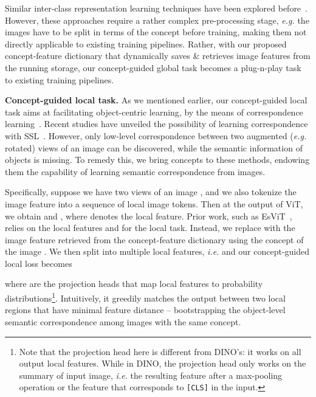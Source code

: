\documentclass{article} \usepackage{iclr2022_conference,times}
\renewcommand{\paragraph}[1]{\noindent\textbf{#1.}}
\begin{document}
Similar inter-class representation learning techniques have been explored before~\citep{wang2017transitive,caron2018deep}. However, these approaches require a rather complex pre-processing stage, \emph{e.g.} the images have to be split in terms of the concept before training, making them not directly applicable to existing training pipelines. Rather, with our proposed concept-feature dictionary that dynamically saves \& retrieves image features from the running storage, our concept-guided global task becomes a plug-n-play task to existing training pipelines. 


\paragraph{Concept-guided local task}
As we mentioned earlier, our concept-guided local task aims at facilitating object-centric learning, by the means of correspondence learning~\citep{liu2010sift,wang2019learning}. Recent studies have unveiled the possibility of learning correspondence with SSL~\citep{densecl,esvit}. However, only low-level correspondence between two augmented (\emph{e.g.} rotated) views of an image can be discovered, while the semantic information of objects is missing. To remedy this, we bring concepts to these methods, endowing them the capability of learning semantic correspondence from images.

Specifically, suppose we have two views  of an image , and we also tokenize the image feature into a sequence of  local image tokens. Then at the output of ViT, we obtain  and  , where  denotes the local feature. Prior work, such as EsViT~\citep{esvit}, relies on the local features  and  for the local task. Instead, we replace  with the image feature  retrieved from the concept-feature dictionary using the concept of the image . We then split  into multiple local features, \emph{i.e.}  and our concept-guided local loss becomes
\vskip -0.25in

\vskip -0.15in
where  are the projection heads that map local features to probability distributions\footnote{Note that the projection head here is different from DINO's: it works on all output local features. While in DINO, the projection head only works on the summary of input image, \emph{i.e.} the resulting feature after a max-pooling operation or the feature that corresponds to \texttt{[CLS]} in the input.}. 
Intuitively, it greedily matches the output between two local regions that have minimal feature distance -- bootstrapping the object-level semantic correspondence among images with the same concept.
\end{document}
